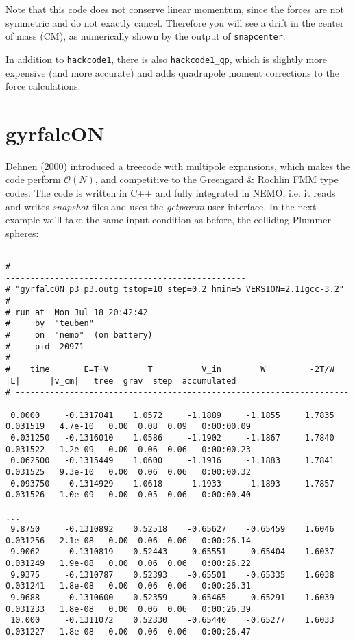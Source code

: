 Note that this code does not conserve linear momentum, since the
forces are not symmetric and do not exactly cancel. Therefore
you will see a drift in the center of mass (CM), as numerically
shown by the output of {\tt snapcenter}.

In addition to {\tt hackcode1}, there is also
{\tt hackcode1\_qp}, which is slightly more expensive (and more accurate) and adds
quadrupole moment corrections to the force calculations. 

\section{gyrfalcON}

Dehnen (2000) introduced a treecode with multipole expansions, which makes
the code perform $\mathcal{O}(N)$, and competitive to the
Greengard \& Rochlin FMM type codes. The code is written in C++ and fully integrated
in NEMO, i.e. it reads and writes {\it snapshot} files and uses the
{\it getparam} user interface. In the next example we'll take the same input condition
as before, the colliding Plummer spheres:


\footnotesize\begin{verbatim}

# ---------------------------------------------------------------------------------------------------------------------
# "gyrfalcON p3 p3.outg tstop=10 step=0.2 hmin=5 VERSION=2.1Igcc-3.2"
#
# run at  Mon Jul 18 20:42:42
#     by  "teuben"
#     on  "nemo"  (on battery)
#     pid  20971
#
#    time       E=T+V        T          V_in        W         -2T/W     |L|      |v_cm|   tree  grav  step  accumulated
# ---------------------------------------------------------------------------------------------------------------------
 0.0000     -0.1317041    1.0572     -1.1889     -1.1855     1.7835  0.031519   4.7e-10   0.00  0.08  0.09   0:00:00.09
 0.031250   -0.1316010    1.0586     -1.1902     -1.1867     1.7840  0.031522   1.2e-09   0.00  0.06  0.06   0:00:00.23
 0.062500   -0.1315449    1.0600     -1.1916     -1.1883     1.7841  0.031525   9.3e-10   0.00  0.06  0.06   0:00:00.32
 0.093750   -0.1314929    1.0618     -1.1933     -1.1893     1.7857  0.031526   1.0e-09   0.00  0.05  0.06   0:00:00.40

...
 9.8750     -0.1310892    0.52518    -0.65627    -0.65459    1.6046  0.031256   2.1e-08   0.00  0.06  0.06   0:00:26.14
 9.9062     -0.1310819    0.52443    -0.65551    -0.65404    1.6037  0.031249   1.9e-08   0.00  0.06  0.06   0:00:26.22
 9.9375     -0.1310787    0.52393    -0.65501    -0.65335    1.6038  0.031241   1.8e-08   0.00  0.06  0.06   0:00:26.31
 9.9688     -0.1310600    0.52359    -0.65465    -0.65291    1.6039  0.031233   1.8e-08   0.00  0.06  0.06   0:00:26.39
 10.000     -0.1311072    0.52330    -0.65440    -0.65277    1.6033  0.031227   1.8e-08   0.00  0.06  0.06   0:00:26.47

\end{verbatim}\normalsize

